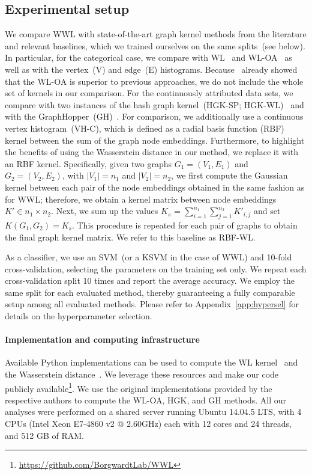 \documentclass{article}
\begin{document}
\subsection{Experimental setup}
\label{sec:expsetup}
We compare WWL with state-of-the-art graph kernel methods from the literature and relevant baselines, which we trained ourselves on the same splits~(see below). In particular, for the categorical case, we compare with WL~\citep{shervashidze2009FastSK} and WL-OA~\citep{kriege2016oa} as well as with the vertex~(V) and edge~(E) histograms. Because~\citep{kriege2016oa} already showed that the WL-OA is superior to previous approaches, we do not include the whole set of kernels in our comparison. For the continuously attributed data sets, we compare with two instances of the hash graph kernel~(HGK-SP; HGK-WL)~\citep{morris2016faster} and with the GraphHopper~(GH)~\citep{feragen2013scalable}. For comparison, we additionally use a continuous vertex histogram~(VH-C), which is defined as a radial basis function (RBF) kernel between the sum of the graph node embeddings. Furthermore,
to highlight the benefits of using the Wasserstein distance in our method, we replace it with an RBF kernel. Specifically, given two graphs $G_1 = (V_1,E_1)$ and $G_2 = (V_2, E_2)$, with $|V_1|=n_1$ and $|V_2| = n_2$, we first compute the Gaussian kernel between each pair of the node embeddings obtained in the same fashion as for WWL; therefore, we obtain a kernel matrix between node embeddings $K' \in n_1 \times n_2$. Next, we sum up the values $K_{s}$ = $\sum_{i=1}^{n_1}\sum_{j=1}^{n_2}K'_{i,j}$ and set $K(G_1,G_2) = K_{s}$. This procedure is repeated for each pair of graphs to obtain the final graph kernel matrix. We refer to this baseline as RBF-WL.

As a classifier, we use an SVM~(or a KSVM in the case of WWL) and 10-fold cross-validation, selecting the parameters on the training set only. We repeat each cross-validation split 10 times and report the average accuracy. We employ the same split for each evaluated method, thereby guaranteeing a fully comparable setup among all evaluated methods. Please refer to Appendix~\ref{app:hypersel} for details on the hyperparameter selection.

\paragraph{Implementation and computing infrastructure}
Available Python implementations can be used to compute the WL kernel~\citep{sugiyama2018graphker} and the Wasserstein distance~\citep{flamary2017pot}. 
We leverage these resources and make our code publicly available\footnote{\href{https://github.com/BorgwardtLab/WWL}{https://github.com/BorgwardtLab/WWL}}. We use the original implementations provided by the respective authors to compute the WL-OA, HGK, and GH methods.
All our analyses were performed on a shared server running Ubuntu 14.04.5 LTS, with 4 CPUs (Intel Xeon E7-4860 v2 @ 2.60GHz) each with 12 cores and 24 threads, and 512 GB of RAM.
\end{document}
